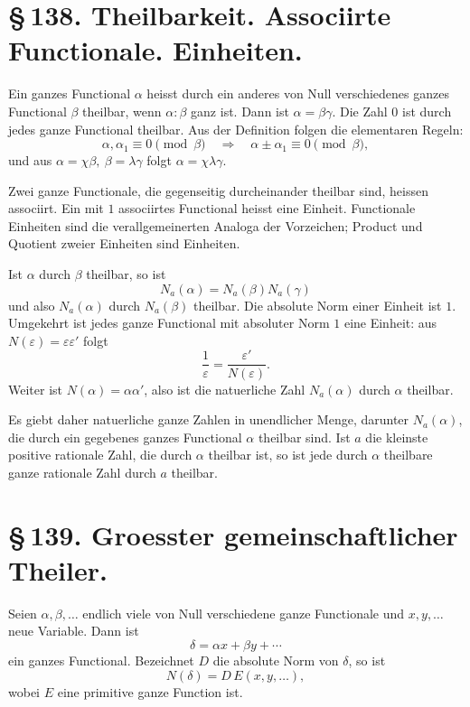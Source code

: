 \documentclass[11pt]{article}
\begin{document}
\section*{\S\,138. Theilbarkeit. Associirte Functionale. Einheiten.}

Ein ganzes Functional \(\alpha\) heisst durch ein anderes von Null
verschiedenes ganzes Functional \(\beta\) theilbar, wenn
\(\alpha:\beta\) ganz ist. Dann ist \(\alpha=\beta\gamma\). Die Zahl
\(0\) ist durch jedes ganze Functional theilbar. Aus der Definition
folgen die elementaren Regeln:
\[
\alpha,\alpha_1\equiv 0\pmod{\beta}\quad\Rightarrow\quad
\alpha\pm\alpha_1\equiv 0\pmod{\beta},
\]
und aus \(\alpha=\chi\beta,\ \beta=\lambda\gamma\) folgt
\(\alpha=\chi\lambda\gamma\).

Zwei ganze Functionale, die gegenseitig durcheinander theilbar sind,
heissen associirt. Ein mit \(1\) associirtes Functional heisst eine
Einheit. Functionale Einheiten sind die verallgemeinerten Analoga der
Vorzeichen; Product und Quotient zweier Einheiten sind Einheiten.

Ist \(\alpha\) durch \(\beta\) theilbar, so ist
\begin{equation}
N_a(\alpha)=N_a(\beta)N_a(\gamma)
\tag{1}
\end{equation}
und also \(N_a(\alpha)\) durch \(N_a(\beta)\) theilbar. Die absolute
Norm einer Einheit ist \(1\). Umgekehrt ist jedes ganze Functional mit
absoluter Norm \(1\) eine Einheit: aus \(N(\varepsilon)=\varepsilon
\varepsilon'\) folgt
\[
\frac1{\varepsilon}=\frac{\varepsilon'}{N(\varepsilon)}.
\]
Weiter ist \(N(\alpha)=\alpha\alpha'\), also ist die natuerliche Zahl
\(N_a(\alpha)\) durch \(\alpha\) theilbar.

Es giebt daher natuerliche ganze Zahlen in unendlicher Menge, darunter
\(N_a(\alpha)\), die durch ein gegebenes ganzes Functional \(\alpha\)
theilbar sind. Ist \(a\) die kleinste positive rationale Zahl, die
durch \(\alpha\) theilbar ist, so ist jede durch \(\alpha\) theilbare
ganze rationale Zahl durch \(a\) theilbar.

\section*{\S\,139. Groesster gemeinschaftlicher Theiler.}

Seien \(\alpha,\beta,\ldots\) endlich viele von Null verschiedene
ganze Functionale und \(x,y,\ldots\) neue Variable. Dann ist
\begin{equation}
\delta=\alpha x+\beta y+\cdots
\tag{1}
\end{equation}
ein ganzes Functional. Bezeichnet \(D\) die absolute Norm von
\(\delta\), so ist
\begin{equation}
N(\delta)=D\,E(x,y,\ldots),
\tag{2}
\end{equation}
wobei \(E\) eine primitive ganze Function ist.
\end{document}

